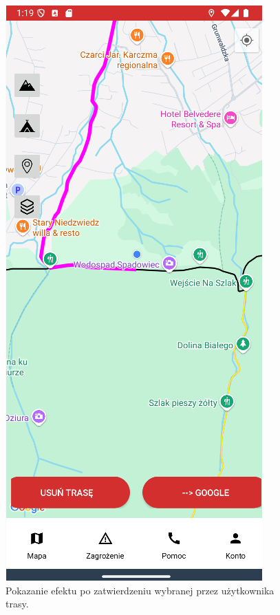\noindent
\begin{figure}[H]
    \centering
    \includegraphics[scale=0.6]{img/imp/widok-trasa.png}
    \caption{Pokazanie efektu po zatwierdzeniu wybranej przez użytkownika trasy.}
    \label{widok:zatwierdztrase}
\end{figure}
\\

